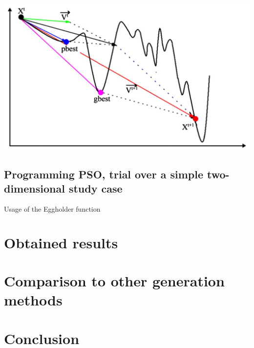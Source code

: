 \documentclass[11pt]{article}
\begin{document}
\begin{multicols}{2}
              \noindent \includegraphics[width=\columnwidth]{figures/PSO.png}
                \medskip
\subsection*{Programming PSO, trial over a simple two-dimensional study case}
Usage of the Eggholder function
\section*{Obtained results}
\section*{Comparison to other generation methods}

\section*{Conclusion}
\end{multicols}


\end{document}
